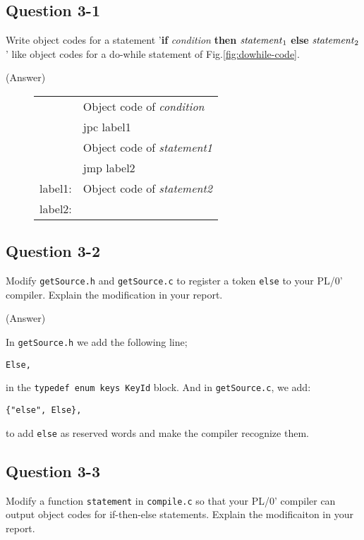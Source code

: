 \documentclass{article}
\begin{document}
\subsection*{Question 3-1}
Write object codes for 
a statement '{\bf if} {\it condition} {\bf then}
${\it statement}_1$ {\bf else} ${\it statement}_2$'
like object codes for a do-while statement of Fig.\ref{fig:dowhile-code}.

\ifreport
(Answer)\\
\fi

\begin{figure}[h]
\begin{tabular}{ll}
        & Object code of {\it condition} \\
        & jpc label1 \\
        & Object code of {\it statement1} \\
        & jmp label2 \\
label1: & Object code of {\it statement2} \\
label2: & \\
\end{tabular}
\end{figure}


\subsection*{Question 3-2}
Modify {\tt getSource.h} and {\tt getSource.c} to register a token
{\tt else} to your PL/0' compiler.
Explain the modification in your report.

\ifreport
(Answer)\\
\fi

In {\tt getSource.h} we add the following line;

\begin{verbatim}
Else,
\end{verbatim}

in the {\tt typedef  enum  keys KeyId} block. And in {\tt getSource.c}, we add:

\begin{verbatim}
{"else", Else},
\end{verbatim}

to add {\tt else} as reserved words and make the compiler recognize them.


\subsection*{Question 3-3}
Modify a function {\tt statement} in {\tt compile.c}
so that your PL/0' compiler can output object codes for if-then-else statements.
Explain the modificaiton in your report.
\end{document}
